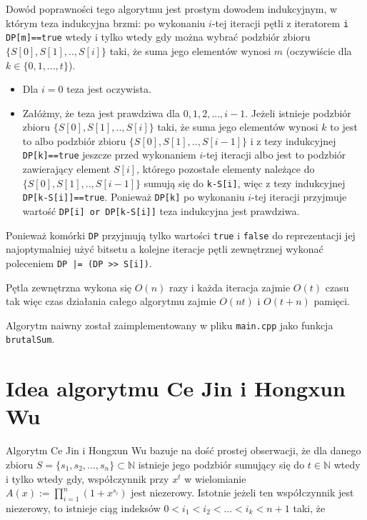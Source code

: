 \documentclass{article}
\begin{document}
Dowód poprawności tego algorytmu jest prostym dowodem indukcyjnym, w którym teza indukcyjna
brzmi: po wykonaniu $i$-tej iteracji pętli z iteratorem \texttt{i}
\texttt{DP[m]==true}
wtedy i tylko wtedy
gdy można wybrać podzbiór zbioru
$\{S\left[0\right],S\left[1\right],..,S\left[i\right]\}$
taki, że suma jego elementów wynosi 
$m$ (oczywiście dla $k \in \{0,1,...,t\}$). 
\begin{itemize}
    \item Dla $i = 0$ teza jest oczywista.
    \item Załóżmy, że teza jest prawdziwa dla $0,1,2,...,i-1$. Jeżeli istnieje podzbiór
    zbioru $\{S \left[ 0 \right],S\left[ 1 \right],..,S\left[ i \right]\}$ taki, że suma jego elementów wynosi $k$ to jest to 
    albo podzbiór zbioru $\{{S\left[0\right],S\left[1\right],..,S\left[i-1\right]\}}$ i z tezy indukcyjnej \texttt{DP[k]==true}
    jeszcze przed wykonaniem $i$-tej iteracji albo jest to podzbiór zawierający element
    $S\left[i \right]$, którego pozostałe elementy należące do 
    $\{S \left[ 0 \right] ,S \left[ 1 \right],..,S \left[ i-1 \right] \}$ sumują się 
    do \texttt{k-S[i]}, więc z tezy indukcyjnej \texttt{DP[k-S[i]]==true}. Ponieważ \texttt{DP[k]} po wykonaniu $i$-tej iteracji
    przyjmuje wartość \texttt{DP[i] or DP[k-S[i]]} teza indukcyjna jest prawdziwa.

\end{itemize}
Ponieważ komórki \texttt{DP} przyjmują tylko wartości \texttt{true} i \texttt{false} do reprezentacji jej najoptymalniej
użyć bitsetu a kolejne iteracje pętli zewnętrznej wykonać poleceniem \texttt{DP |= (DP >> S[i])}.

Pętla zewnętrzna wykona się $O(n)$ razy i każda iteracja zajmie $O(t)$ czasu tak więc
czas działania całego algorytmu zajmie $O(nt)$ i $O(t+n)$ pamięci.

Algorytm naiwny został zaimplementowany w pliku \texttt{main.cpp} jako funkcja \texttt{brutalSum}.

\section{Idea algorytmu Ce Jin i Hongxun Wu}


Algorytm Ce Jin i Hongxun Wu bazuje na dość prostej obserwacji, że dla danego zbioru
$S=\{s_1,s_2,...,s_n\} \subset \mathbb{N}$ istnieje jego podzbiór sumujący się do $t \in \mathbb{N}$ wtedy 
i tylko wtedy gdy, współczynnik przy $x^t$ w  wielomianie $A(x) :=\prod_{i = 1}^{n}(1+x^{s_i})$ jest 
niezerowy. Istotnie jeżeli ten współczynnik jest niezerowy, to istnieje ciąg indeksów $0<i_1<i_2<...<i_k<n+1$ taki, że 
\end{document}
